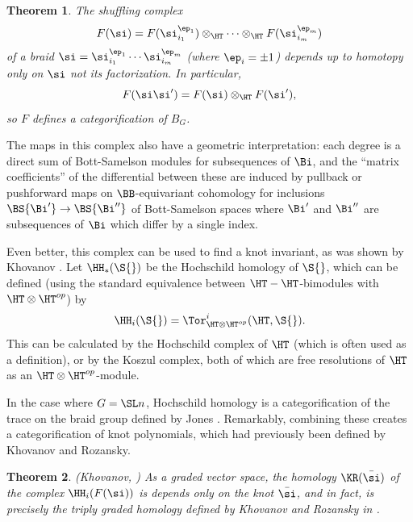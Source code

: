 \documentclass[12pt]{wart}
\newtheorem{thm}{Theorem}[section]
\theoremstyle{remark}
\begin{document}
\begin{thm} The shuffling complex
  \begin{equation*}
    F(\si)=F(\si_{i_1}^{\ep_1})\otimes_{\HT}\cdots \otimes_{\HT}F(\si_{i_m}^{\ep_m})
  \end{equation*}
  of a braid $\si=\si_{i_1}^{\ep_1}\cdots\si_{i_m}^{\ep_m}$ (where $\ep_i=\pm 1$) depends up to homotopy only on $\si$ not its factorization.  In particular,
  \begin{equation*}
    F(\si\si')=F(\si)\otimes_{\HT}F(\si'),
  \end{equation*}
  so $F$ defines a categorification of $B_G$.
\end{thm}

The maps in this complex also have a geometric interpretation: each
degree is a direct sum of Bott-Samelson modules for subsequences of
$\Bi$, and the ``matrix coefficients'' of the differential between
these are induced by pullback or pushforward maps on $\BB$-equivariant
cohomology for inclusions $\BS{\Bi'}\to\BS{\Bi''}$ of Bott-Samelson
spaces where $\Bi'$ and $\Bi''$ are subsequences of $\Bi$ which differ
by a single index.

Even better, this complex can be used to find a knot invariant, as was
shown by Khovanov \cite{Kho05}.  Let $\HH_*(\S{})$ be the Hochschild
homology of $\S{}$, which can be defined (using the standard equivalence
between $\HT-\HT$-bimodules with $\HT\otimes\HT^{op}$) by
\begin{equation*}
  \HH_i(\S{})=\Tor^i_{\HT\otimes\HT^{op}}(\HT,\S{}).
\end{equation*}
This can be calculated by the Hochschild complex of $\HT$ (which is
often used as a definition), or by the Koszul complex, both of which
are free resolutions of $\HT$ as an $\HT\otimes\HT^{op}$-module.

In the case where $G=\SL n$, Hochschild homology is a categorification
of the trace on the braid group defined by Jones \cite{Jon87}.
Remarkably, combining these creates a categorification of knot
polynomials, which had previously been defined by Khovanov and
Rozansky.

\begin{thm}
  {\rm (Khovanov, \cite{Kho05})} As a graded vector space, the homology $\KR(\bar\si)$ of the
  complex $\HH_i(F( \si))$ is depends only on the knot $\bar\si$, and
  in fact, is precisely the triply graded homology defined by Khovanov
  and Rozansky in \cite{KR05}.
\end{thm}
\end{document}
